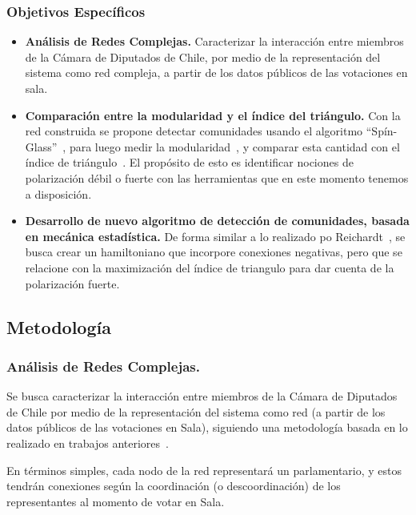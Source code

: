 \documentclass{proyectotesis}
\begin{document}
\subsubsection*{Objetivos Específicos}
\begin{itemize}
\item    {\bf Análisis de Redes Complejas.} Caracterizar la interacción entre miembros de la Cámara de Diputados de Chile, por medio de la representación del sistema como red compleja, a partir de los datos públicos de las votaciones en sala.

\item{\bf Comparación entre la modularidad y el índice del triángulo.} Con la red construida se propone detectar comunidades usando el algoritmo ``Spín-Glass''~\cite{reichardt_statistical_2006}, para luego medir la modularidad~\cite{newman_finding_2004}, y comparar esta cantidad con el índice de triángulo~\cite{aref_measuring_2018}. El propósito de esto es identificar nociones de polarización débil o fuerte con las herramientas que en este momento tenemos a disposición.

\item {\bf Desarrollo de nuevo algoritmo de detección de comunidades, basada en mecánica estadística.} De forma similar a lo realizado po Reichardt~\cite{reichardt_statistical_2006}, se busca crear un hamiltoniano que incorpore conexiones negativas, pero que se relacione con la maximización del índice de triangulo para dar cuenta de la polarización fuerte.

\end{itemize}

\subsection{Metodología}
\subsubsection{Análisis de Redes Complejas.}
Se busca caracterizar la interacción entre miembros de la Cámara de Diputados de Chile por medio de la representación del sistema como red (a partir de los datos públicos de las votaciones en Sala), siguiendo una metodología basada en lo realizado en trabajos anteriores~\cite{andris_rise_2015, marenco_time_2020, schoch_legislators_2020, intal_dissent_2021}. 

En términos simples, cada nodo de la red representará un parlamentario, y estos tendrán conexiones según la coordinación (o descoordinación) de los representantes al momento de votar en Sala.\\
\end{document}
